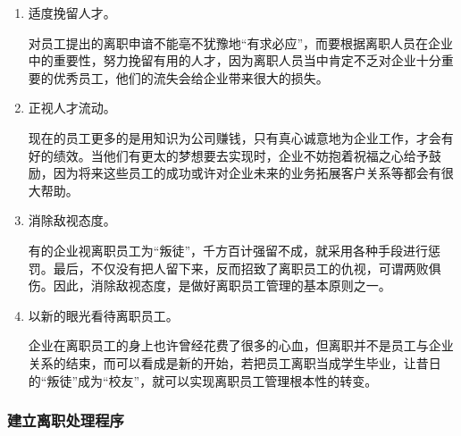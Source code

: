     \begin{enumerate}
        \item 适度挽留人才。

        对员工提出的离职申谙不能亳不犹豫地“有求必应”，而要根据离职人员在企业中的重要性，努力挽留有用的人才，因为离职人员当中肯定不乏对企业十分重要的优秀员工，他们的流失会给企业带来很大的损失。

        \item 正视人才流动。

        现在的员工更多的是用知识为公司赚钱，只有真心诚意地为企业工作，才会有好的绩效。当他们有更太的梦想要去实现时，企业不妨抱着祝福之心给予鼓励，因为将来这些员工的成功或许对企业未来的业务拓展客户关系等都会有很大帮助。

        \item 消除敌视态度。

        有的企业视离职员工为“叛徒”，千方百计强留不成，就采用各种手段进行惩罚。最后，不仅没有把人留下来，反而招致了离职员工的仇视，可谓两败俱伤。因此，消除敌视态度，是做好离职员工管理的基本原则之一。

        \item 以新的眼光看待离职员工。

        企业在离职员工的身上也许曾经花费了很多的心血，但离职并不是员工与企业关系的结束，而可以看成是新的开始，若把员工离职当成学生毕业，让昔日的“叛徒”成为“校友”，就可以实现离职员工管理根本性的转变。
    \end{enumerate}

\subsubsection {建立离职处理程序}

